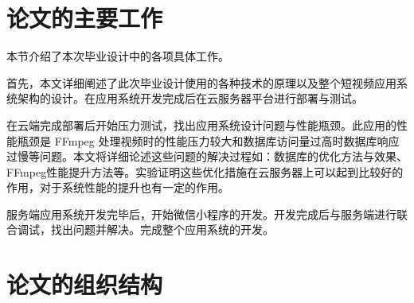 \section{论文的主要工作}

本节介绍了本次毕业设计中的各项具体工作。

首先，本文详细阐述了此次毕业设计使用的各种技术的原理以及整个短视频应用系统架构的设计。在应用系统开发完成后在云服务器平台进行部署与测试。

在云端完成部署后开始压力测试，找出应用系统设计问题与性能瓶颈。此应用的性能瓶颈是 FFmpeg 处理视频时的性能压力较大和数据库访问量过高时数据库响应过慢等问题。本文将详细论述这些问题的解决过程如：数据库的优化方法与效果、FFmpeg性能提升方法等。实验证明这些优化措施在云服务器上可以起到比较好的作用，对于系统性能的提升也有一定的作用。

服务端应用系统开发完毕后，开始微信小程序的开发。开发完成后与服务端进行联合调试，找出问题并解决。完成整个应用系统的开发。




\section{论文的组织结构}

